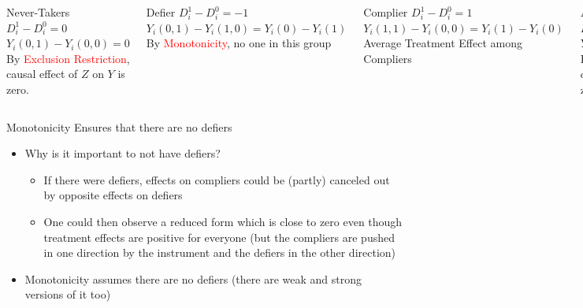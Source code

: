 \documentclass{beamer}
\begin{document}
\begin{frame}[plain]
	\begin{columns}[t]
	\scriptsize
	\begin{block}{Never-Takers}
		$D^1_i - D^0_i = 0$ \\
		$Y_i(0,1) - Y_i(0,0) = 0$ \\
		By \textcolor{red}{Exclusion Restriction}, causal effect of $Z$ on $Y$ is zero.
	\end{block}
	\begin{block}{Defier}
		$D^1_i - D^0_i = -1$ \\
		$Y_i(0,1) - Y_i(1,0) = Y_i(0) - Y_i(1)$ \\
		By \textcolor{red}{Monotonicity}, no one in this group
	\end{block}
	\begin{block}{Complier}
		$D^1_i - D^0_i = 1$ \\
		$Y_i(1,1) - Y_i(0,0) = Y_i(1) - Y_i(0)$ \\
		Average Treatment Effect among Compliers
	\end{block}
	\begin{block}{Always-taker}
		$D^1_i - D^0_i = 0$ \\
		$Y_i(1,1) - Y_i(1,0) = 0$ \\
		By \textcolor{red}{Exclusion Restriction}, causal effect of $Z$ on $Y$ is zero.
	\end{block}
	\end{columns}
\end{frame}


\begin{frame}{Monotonicity Ensures that there are no defiers}
	
	\begin{itemize}
	\item Why is it important to not have defiers?
		\begin{itemize}
		\item If there were defiers, effects on compliers could be (partly) canceled out by opposite effects on defiers
		\item One could then observe a reduced form which is close to zero even though treatment effects are positive for everyone (but the compliers are pushed in one direction by the instrument and the defiers in the other direction)
		\end{itemize}
	\item Monotonicity assumes there are no defiers (there are weak and strong versions of it too)
	\end{itemize}

\end{frame}
\end{document}
